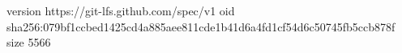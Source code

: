 version https://git-lfs.github.com/spec/v1
oid sha256:079bf1ccbed1425cd4a885aee811cde1b41d6a4fd1cf54d6c50745fb5ccb878f
size 5566

